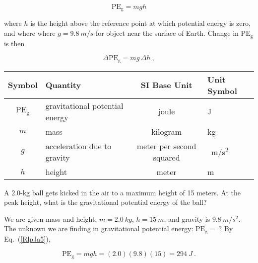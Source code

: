 \documentclass[main.tex]{subfiles}
\begin{document}
\begin{equation} \label{RlpJa5}
    \mathrm{PE_g} = mgh
\end{equation}

where $h$ is the height above the reference point at which potential energy is zero, and where where $g = \SI{9.8}{m/s}$ for object near the surface of Earth. Change in $\mathrm{PE_g}$ is then

\begin{equation} 
    \Delta\mathrm{PE_g} = m g\,\Delta h\ ,
\end{equation}

\begin{center}
    \begin{tabular}{cl|cl}
    \hline
    \textbf{Symbol} & \textbf{Quantity} & \textbf{SI Base Unit} & \textbf{Unit Symbol}  \\
    \hline\hline
    \rule{0pt}{2.5ex}
        $\mathrm{PE_g}$ & gravitational potential energy & joule & J\\
        $m$ & mass & kilogram & kg\\
        $g$ & acceleration due to gravity & meter per second squared & \SI{}{m/s^2}\\
        $h$ & height & meter & m\\
    \hline
    \end{tabular}
\end{center}

\cyanhrule

\begin{example} \label{J1Qehp}
A 2.0-kg ball gets kicked in the air to a maximum height of 15 meters. At the peak height, what is the gravitational potential energy of the ball?
\end{example}

\Solution We are given mass and height: $m = \SI{2.0}{kg}$, $h = \SI{15}{m}$, and gravity is $\SI{9.8}{m/s^2}$. The unknown we are finding in gravitational potential energy: $\mathrm{PE_g} =\ ?$ By Eq.~(\ref{RlpJa5}),

\begin{equation*}
    \mathrm{PE_g} = m g h = (2.0)(9.8)(15) =  \SI{294}{J} \ .
\end{equation*}

\cyanhrule

\end{document}
